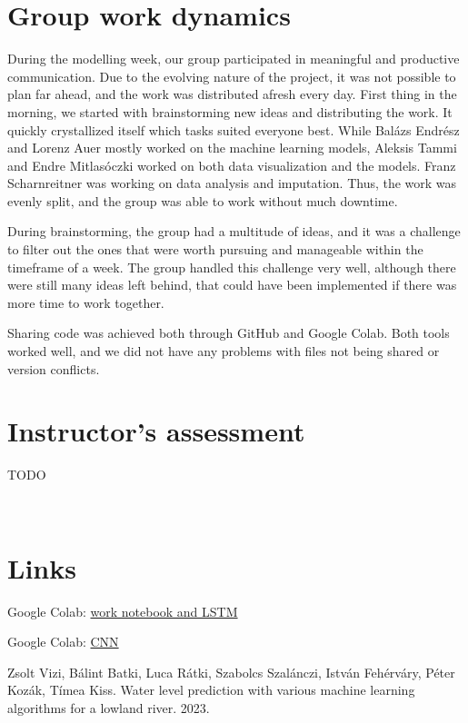 \documentclass{article}
\begin{document}
\section{Group work dynamics}

During the modelling week, our group participated in meaningful and productive
communication. Due to the evolving nature of the project, it was not possible
to plan far ahead, and the work was distributed afresh every day. First thing
in the morning, we started with brainstorming new ideas and distributing the
work. It quickly crystallized itself which tasks suited everyone best. While
Bal{\'a}zs Endr{\'e}sz and Lorenz Auer mostly worked on the machine learning
models, Aleksis Tammi and Endre Mitlas{\'o}czki worked on both data
visualization and the models. Franz Scharnreitner was working on data analysis
and imputation. Thus, the work was evenly split, and the group was able to
work without much downtime.

During brainstorming, the group had a multitude of ideas, and it was a
challenge to filter out the ones that were worth pursuing and manageable
within the timeframe of a week. The group handled this challenge very well,
although there were still many ideas left behind, that could have been
implemented if there was more time to work together.

Sharing code was achieved both through GitHub and Google Colab. Both tools
worked well, and we did not have any problems with files not being shared or
version conflicts.

\section{Instructor's assessment}

TODO

\

\section{Links}

Google Colab:
\href{https://colab.research.google.com/drive/1ZobMWBW76xJHmeTsbXmjmgCzcv5sGrSV?usp=sharing}{work
notebook and LSTM}

Google Colab:
\href{https://colab.research.google.com/drive/1TM0TM2p8cphnl7WuYu9bTIFMF2lW8gyv?usp=sharing}{CNN}

\begin{thebibliography}{1}
  \label{docs-internal-guid-e18268f8-7fff-47a5-5726-e8ca81959750}Zsolt
  Vizi, B{\'a}lint Batki, Luca R{\'a}tki, Szabolcs Szal{\'a}nczi, Istv{\'a}n
  Feh{\'e}rv{\'a}ry, P{\'e}ter Koz{\'a}k, T{\'i}mea Kiss. {\newblock}Water
  level prediction with various machine learning algorithms for a lowland
  river. {\newblock}2023.{\newblock}
\end{thebibliography}
\end{document}
